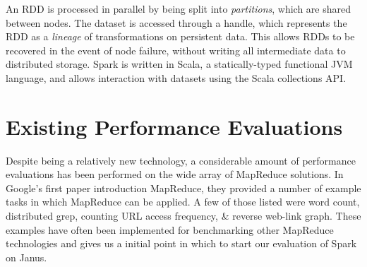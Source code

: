 \documentclass{article}
\begin{document}
An RDD is processed in parallel by being split into \emph{partitions}, which
are shared between nodes. The dataset is accessed through a handle, which
represents the RDD as a \emph{lineage} of transformations on persistent data.
This allows RDDs to be recovered in the event of node failure, without writing
all intermediate data to distributed storage. Spark is written in Scala,
a statically-typed functional JVM language, and allows interaction with datasets
using the Scala collections API.





\section*{Existing Performance Evaluations }
Despite being a relatively new technology, a considerable amount of performance
evaluations has been performed on the wide array of MapReduce solutions.
In Google's first paper introduction MapReduce, they provided a number of
example tasks in which MapReduce can be applied. A few of those listed were
word count, distributed grep, counting URL access frequency, \& reverse web-link
graph\citep{dean-mapreduce}. These examples have often been implemented for
benchmarking other MapReduce technologies and gives us a initial point in which
to start our evaluation of Spark on Janus.
\end{document}
